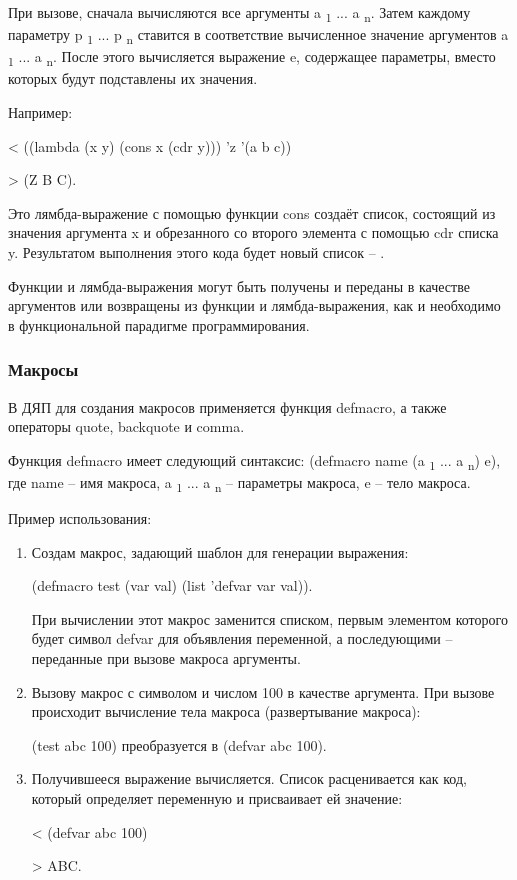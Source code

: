 При вызове, сначала вычисляются все аргументы a \textsubscript 1 ... a \textsubscript n. Затем каждому параметру p \textsubscript 1 ... p \textsubscript n ставится в соответствие вычисленное значение аргументов a \textsubscript 1 ... a \textsubscript n. После этого вычисляется выражение e, содержащее параметры, вместо которых будут подставлены их значения.

Например:

< ((lambda (x y) (cons x (cdr y))) 'z '(a b c))

> (Z B C).

Это лямбда-выражение с помощью функции cons создаёт список, состоящий из значения аргумента x и обрезанного со второго элемента с помощью cdr списка y. Результатом выполнения этого кода будет новый список -- .

Функции и лямбда-выражения могут быть получены и переданы в качестве аргументов или возвращены из функции и лямбда-выражения, как и необходимо в функциональной парадигме программирования.


\subsubsection{Макросы}

В ДЯП для создания макросов применяется функция defmacro, а также операторы quote, backquote и comma.

Функция defmacro имеет следующий синтаксис:
(defmacro name (a \textsubscript 1 ... a \textsubscript n) e), где name -- имя макроса, a \textsubscript 1 ... a \textsubscript n -- параметры макроса, e -- тело макроса.

Пример использования:

\begin{enumerate}
	\item Создам макрос, задающий шаблон для генерации выражения:
	
	(defmacro test (var val) (list 'defvar var val)).
	
	При вычислении этот макрос заменится списком, первым элементом которого будет символ defvar для объявления переменной, а последующими -- переданные при вызове макроса аргументы.
	
	\item Вызову макрос с символом  и числом 100 в качестве аргумента. При вызове происходит вычисление тела макроса (развертывание макроса):
	
	(test abc 100) преобразуется в (defvar abc 100).
	
	\item Получившееся выражение вычисляется. Список расценивается как код, который определяет переменную и присваивает ей значение:
	
	< (defvar abc 100)
	
	> ABC.
\end{enumerate}

